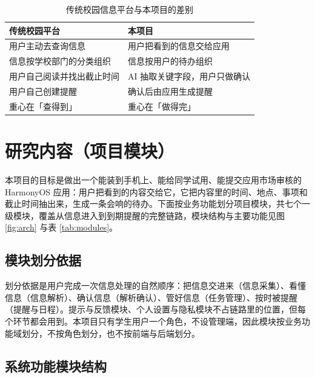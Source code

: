 \documentclass[12pt,a4paper,fontset=windows]{ctexart}
\begin{document}
\begin{table}[tbp]
\centering
\caption{传统校园信息平台与本项目的差别}
\label{tab:diff}
\small
\begin{tabularx}{\linewidth}{@{}lX@{}}
\toprule
\textbf{传统校园平台} & \textbf{本项目} \\
\midrule
用户主动去查询信息 & 用户把看到的信息交给应用 \\
信息按学校部门的分类组织 & 信息按用户的待办组织 \\
用户自己阅读并找出截止时间 & AI 抽取关键字段，用户只做确认 \\
用户自己创建提醒 & 确认后由应用生成提醒 \\
重心在「查得到」 & 重心在「做得完」 \\
\bottomrule
\end{tabularx}
\end{table}

\section{研究内容（项目模块）}
\label{sec:modules}

本项目的目标是做出一个能装到手机上、能给同学试用、能提交应用市场审核的 HarmonyOS 应用：用户把看到的内容交给它，它把内容里的时间、地点、事项和截止时间抽出来，生成一条会响的待办。下面按业务功能划分项目模块，共七个一级模块，覆盖从信息进入到到期提醒的完整链路，模块结构与主要功能见图 \ref{fig:arch} 与表 \ref{tab:modules}。

\subsection{模块划分依据}

划分依据是用户完成一次信息处理的自然顺序：把信息交进来（信息采集）、看懂信息（信息解析）、确认信息（解析确认）、管好信息（任务管理）、按时被提醒（提醒与日程）。提示与反馈模块、个人设置与隐私模块不占链路里的位置，但每个环节都会用到。本项目只有学生用户一个角色，不设管理端，因此模块按业务功能域划分，不按角色划分，也不按前端与后端划分。

\subsection{系统功能模块结构}
\end{document}
